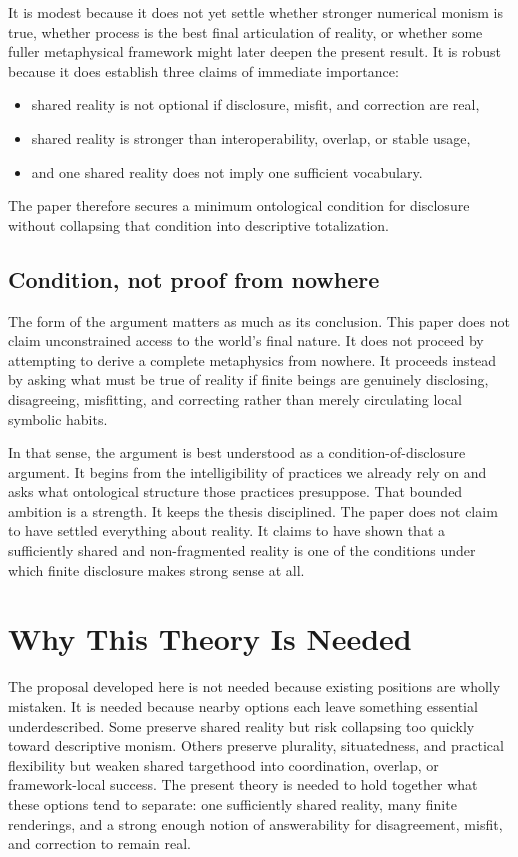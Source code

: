 \documentclass[11pt]{article}
\begin{document}
It is modest because it does not yet settle whether stronger numerical monism is true, whether process is the best final articulation of reality, or whether some fuller metaphysical framework might later deepen the present result. It is robust because it does establish three claims of immediate importance:

\begin{itemize}
    \item shared reality is not optional if disclosure, misfit, and correction are real,
    \item shared reality is stronger than interoperability, overlap, or stable usage,
    \item and one shared reality does not imply one sufficient vocabulary.
\end{itemize}

The paper therefore secures a minimum ontological condition for disclosure without collapsing that condition into descriptive totalization.

\subsection{Condition, not proof from nowhere}

The form of the argument matters as much as its conclusion. This paper does not claim unconstrained access to the world's final nature. It does not proceed by attempting to derive a complete metaphysics from nowhere. It proceeds instead by asking what must be true of reality if finite beings are genuinely disclosing, disagreeing, misfitting, and correcting rather than merely circulating local symbolic habits.

In that sense, the argument is best understood as a condition-of-disclosure argument. It begins from the intelligibility of practices we already rely on and asks what ontological structure those practices presuppose. That bounded ambition is a strength. It keeps the thesis disciplined. The paper does not claim to have settled everything about reality. It claims to have shown that a sufficiently shared and non-fragmented reality is one of the conditions under which finite disclosure makes strong sense at all.
\section{Why This Theory Is Needed}

The proposal developed here is not needed because existing positions are wholly mistaken. It is needed because nearby options each leave something essential underdescribed. Some preserve shared reality but risk collapsing too quickly toward descriptive monism. Others preserve plurality, situatedness, and practical flexibility but weaken shared targethood into coordination, overlap, or framework-local success. The present theory is needed to hold together what these options tend to separate: one sufficiently shared reality, many finite renderings, and a strong enough notion of answerability for disagreement, misfit, and correction to remain real.
\end{document}
